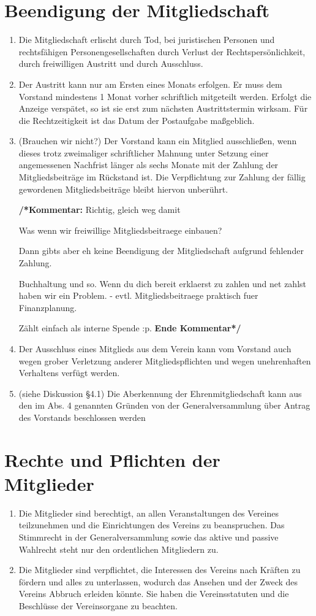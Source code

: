 \documentclass[a4paper,12pt]{article}
\newcommand{\comment}[1]{{\bf /*Kommentar:} #1 {\bf Ende Kommentar*/}}
\begin{document}
\section{Beendigung der Mitgliedschaft} %
\begin{enumerate}
\item Die Mitgliedschaft erlischt durch Tod, bei juristischen Personen und rechtsfähigen Personengesellschaften durch Verlust der Rechtspersönlichkeit, durch freiwilligen Austritt und durch Ausschluss.
\item Der Austritt kann nur am Ersten eines Monats erfolgen. Er muss dem Vorstand mindestens 1 Monat vorher schriftlich mitgeteilt werden. Erfolgt die Anzeige verspätet, so ist sie erst zum nächsten Austrittstermin wirksam. Für die Rechtzeitigkeit ist das Datum der Postaufgabe maßgeblich.
\item (Brauchen wir nicht?) Der Vorstand kann ein Mitglied ausschließen, wenn dieses trotz zweimaliger schriftlicher Mahnung unter Setzung einer angemessenen Nachfrist länger als sechs Monate mit der Zahlung der Mitgliedsbeiträge im Rückstand ist. Die Verpflichtung zur Zahlung der fällig gewordenen Mitgliedsbeiträge bleibt hiervon unberührt. 

\comment{Richtig, gleich weg damit

Was wenn wir freiwillige Mitgliedsbeitraege einbauen? 

Dann gibts aber eh keine Beendigung der Mitgliedschaft aufgrund fehlender Zahlung. 

Buchhaltung und so. Wenn du dich bereit erklaerst zu zahlen und net zahlst haben wir ein Problem.  - evtl. Mitgliedsbeitraege praktisch fuer Finanzplanung.

Zählt einfach als interne Spende :p.}
\item Der Ausschluss eines Mitglieds aus dem Verein kann vom Vorstand auch wegen grober Verletzung anderer Mitgliedspflichten und wegen unehrenhaften Verhaltens verfügt werden.
\item (siehe Diskussion §4.1) Die Aberkennung der Ehrenmitgliedschaft kann aus den im Abs. 4 genannten Gründen von der Generalversammlung über Antrag des Vorstands beschlossen werden
\end{enumerate}

\section{Rechte und Pflichten der Mitglieder} %
\begin{enumerate}
\item Die Mitglieder sind berechtigt, an allen Veranstaltungen des Vereines teilzunehmen und die Einrichtungen des Vereins zu beanspruchen. Das Stimmrecht in der Generalversammlung sowie das aktive und passive Wahlrecht steht nur den ordentlichen Mitgliedern zu.
\item Die Mitglieder sind verpflichtet, die Interessen des Vereins nach Kräften zu fördern und alles zu unterlassen, wodurch das Ansehen und der Zweck des Vereins Abbruch erleiden könnte. Sie haben die Vereinsstatuten und die Beschlüsse der Vereinsorgane zu beachten.
\end{enumerate}
\end{document}
